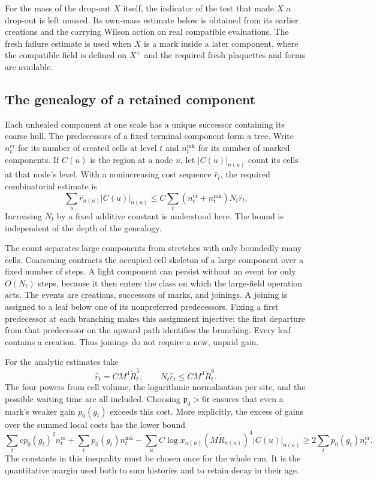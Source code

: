 \documentclass[11pt,letterpaper,reqno]{amsart}
\theoremstyle{definition}
\theoremstyle{remark}
\begin{document}
For the mass of the drop-out \(X\) itself, the indicator of the
test that made \(X\) a drop-out is left unused. Its own-mass
estimate below is obtained from its earlier creations and the
carrying Wilson action on real compatible evaluations. The fresh
failure estimate is used when \(X\) is a mark inside a later
component, where the compatible field is defined on \(X^+\)
and the required fresh plaquettes and forms are available.

\subsection{The genealogy of a retained component}

Each unhealed component at one scale has a unique successor containing
its coarse hull. The predecessors of a fixed terminal component form
a tree. Write $n_t^{\mathrm{cr}}$ for its number of created cells at
level $t$ and $n_t^{\mathrm{mk}}$ for its number of marked components.
If $C(u)$ is the region at a node $u$, let $|C(u)|_{n(u)}$ count its
cells at that node's level. With a nonincreasing cost sequence
$\widehat r_t$, the required combinatorial estimate is
\begin{equation}\label{eq:genealogy-count}
 \sum_u\widehat r_{n(u)}|C(u)|_{n(u)}
 \le C\sum_t
       (n_t^{\mathrm{cr}}+n_t^{\mathrm{mk}})
                  N_t\widehat r_t.
\end{equation}
Increasing $N_t$ by a fixed additive constant is understood here.
The bound is independent of the depth of the genealogy.

The count separates large components from stretches with only
boundedly many cells. Coarsening contracts the occupied-cell skeleton
of a large component over a fixed number of steps. A light component
can persist without an event for only $O(N_t)$ steps, because it then
enters the class on which the large-field operation acts. The events
are creations, successors of marks, and joinings. A joining is assigned
to a leaf below one of its nonpreferred predecessors. Fixing a first
predecessor at each branching makes this assignment injective: the
first departure from that predecessor on the upward path identifies
the branching. Every leaf contains a creation. Thus joinings do not
require a new, unpaid gain.

For the analytic estimates take
\[
 \widehat r_t=CM^4\check R_t^5,
 \qquad N_t\widehat r_t\le CM^4\check R_t^6.
\]
The four powers from cell volume, the logarithmic normalisation per
site, and the possible waiting time are all included. Choosing
$\mathfrak p_0>6\mathfrak r$ ensures that even a mark's weaker gain
$p_0(g_t)$ exceeds this cost. More explicitly, the excess of gains
over the summed local costs has the lower bound
\begin{equation}\label{eq:genealogy-gain}
 \sum_t cp_0(g_t)^2n_t^{\mathrm{cr}}
 +\sum_t p_0(g_t)n_t^{\mathrm{mk}}
 -\sum_u C\log x_{n(u)}(M\check R_{n(u)})^4|C(u)|_{n(u)}
 \ge 2\sum_t p_0(g_t)n_t^{\mathrm{cr}}.
\end{equation}
The constants in this inequality must be chosen once for the whole
run. It is the quantitative margin used both to sum histories and
to retain decay in their age.
\end{document}
